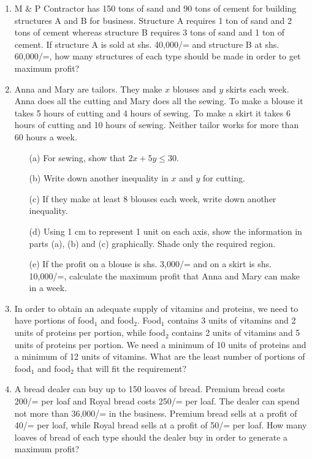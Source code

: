 \begin{enumerate}

	\item M \& P Contractor has 150 tons of sand and 90 tons of cement for building structures A and B for business. Structure A requires 1 ton of sand and 2 tons of cement whereas structure B requires 3 tons of sand and 1 ton of cement. If structure A is sold at shs. 40,000/= and structure B at shs. 60,000/=, how many structures of each type should be made in order to get maximum profit?
	
	\item Anna and Mary are tailors. They make $x$ blouses and $y$ skirts each week. Anna does all the cutting and Mary does all the sewing. To make a blouse it takes 5 hours of cutting and 4 hours of sewing. To make a skirt it takes 6 hours of cutting and 10 hours of sewing. Neither tailor works for more than 60 hours a week.
		\begin{itemize}
		\item[(a)] For sewing, show that $2x + 5y \leq 30$.
		\item[(b)] Write down another inequality in $x$ and $y$ for cutting.
		\item[(c)] If they make at least 8 blouses each week, write down another inequality.
		\item[(d)] Using 1 cm to represent 1 unit on each axis, show the information in parts (a), (b) and (c) graphically. Shade only the required region.
		\item[(e)] If the profit on a blouse is shs. 3,000/= and on a skirt is shs. 10,000/=, calculate the maximum profit that Anna and Mary can make in a week.
		\end{itemize}
	
	\item In order to obtain an adequate supply of vitamins and proteins, we need to have portions of food$_1$ and food$_2$. Food$_1$ contains 3 units of vitamins and 2 units of proteins per portion, while food$_2$ contains 2 units of vitamins and 5 units of proteins per portion. We need a minimum of 10 units of proteins and a minimum of 12 units of vitamins. What are the least number of portions of food$_1$ and food$_2$ that will fit the requirement?
	
	\item A bread dealer can buy up to 150 loaves of bread. Premium bread costs 200/= per loaf and Royal bread costs 250/= per loaf. The dealer can spend not more than 36,000/= in the business. Premium bread sells at a profit of 40/= per loaf, while Royal bread sells at a profit of 50/= per loaf. How many loaves of bread of each type should the dealer buy in order to generate a maximum profit?
	

\end{enumerate}
